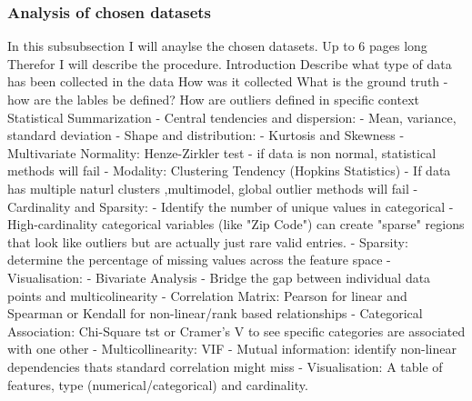 \subsubsection{Analysis of chosen datasets}
In this subsubsection I will anaylse the chosen datasets. Up to 6 pages long
Therefor I will describe the procedure.
    Introduction    
        Describe what type of data has been collected in the data
        How was it collected
        What is the ground truth - how are the lables be defined?
        How are outliers defined in specific context
    Statistical Summarization
        - Central tendencies and dispersion:
            - Mean, variance, standard deviation
        - Shape and distribution:
            - Kurtosis and Skewness
            - Multivariate Normality: Henze-Zirkler test - if data is non normal, statistical methods will fail
            - Modality: Clustering Tendency (Hopkins Statistics) - If data has multiple naturl clusters ,multimodel, global outlier methods will fail 
        - Cardinality and Sparsity:
            - Identify the number of unique values in categorical - High-cardinality categorical variables (like "Zip Code") can create "sparse" 
                regions that look like outliers but are actually just rare valid entries.
            - Sparsity: determine the percentage of missing values across the feature space
            - Visualisation: 
        - Bivariate Analysis
            - Bridge the gap between individual data points and multicolinearity
            - Correlation Matrix: Pearson for linear and Spearman or Kendall for non-linear/rank based relationships
            - Categorical Association: Chi-Square tst or Cramer's V to see specific categories are associated with one other
            - Multicollinearity: VIF
            - Mutual information: identify non-linear dependencies thats standard correlation might miss
       - Visualisation: A table of features, type (numerical/categorical) and cardinality.


